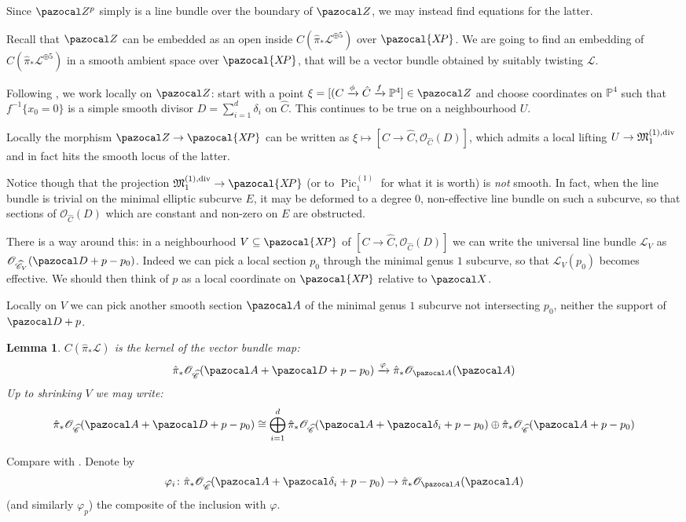 \documentclass[11pt]{amsart}
\newcommand{\PP}{\mathbb P}
\newcommand{\OO}{\mathcal O}
\renewcommand{\to}{\rightarrow}
\newcommand{\A}{\pazocal A}
\newcommand{\X}{\pazocal X}
\newcommand{\XP}{\pazocal{X\!P}}
\newcommand{\hC}{\widehat{\mathcal C}}
\newcommand{\Z}{\pazocal Z}
\newcommand{\MM}{\mathfrak M}
\newcommand{\Pic}{\operatorname{Pic}}
\theoremstyle{plain}
\newtheorem{lem}[thm]{Lemma}
\theoremstyle{definition}
\begin{document}
Since $\Z^p$ simply is a line bundle over the boundary of $\Z$, we may instead find equations for the latter.

Recall that $\Z$ can be embedded as an open inside $C(\hat{\pi}_*\mathcal L^{\oplus 5})$ over $\XP$. We are going to find an embedding of $C(\hat{\pi}_*\mathcal L^{\oplus 5})$ in a smooth ambient space over $\XP$, that will be a vector bundle obtained by suitably twisting $\mathcal L$.

Following \cite{HL}, we work locally on $\Z$: start with a point $\xi=[(C\xrightarrow{\phi}\hat C\xrightarrow{f}\PP^4]\in\Z$ and choose coordinates on $\PP^4$ such that $f^{-1}\{x_0=0\}$ is a simple smooth divisor $D=\sum_{i=1}^d\delta_i$ on $\hat C$. This continues to be true on a neighbourhood $U$.

 Locally the morphism $\Z\to\XP$ can be written as $\xi\mapsto[C\to\hat C,\OO_{\hat C}(D)]$, which admits a local lifting $U\to\MM_1^{(1),\rm{div}}$ and in fact hits the smooth locus of the latter.
 
  Notice though that the projection $\MM_1^{(1),\rm{div}}\to \XP$ (or to $\Pic_1^{(1)}$ for what it is worth) is \emph{not} smooth. In fact, when the line bundle is trivial on the minimal elliptic subcurve $E$, it may be deformed to a degree $0$, non-effective line bundle on such a subcurve, so that sections of $\OO_{\hat C}(D)$ which are constant and non-zero on $E$ are obstructed.

There is a way around this: in a neighbourhood $V\subseteq \XP$ of $[C\to\hat C,\OO_{\hat C}(D)]$ we can write the universal line bundle $\mathcal L_V$ as $\OO_{\hC_V}(\pazocal D + p-p_0)$. Indeed we can pick a local section $p_0$ through the minimal genus $1$ subcurve, so that $\mathcal L_V(p_0)$ becomes effective. We should then think of $p$ as a local coordinate on $\XP$ relative to $\X$.

Locally on $V$ we can pick another smooth section $\A$ of the minimal genus $1$ subcurve not intersecting $p_0$, neither the support of $\pazocal D+p$.

\begin{lem}
$C(\hat\pi_*\mathcal L)$ is the kernel of the vector bundle map:
\[ \hat\pi_*\OO_{\hC}(\A+\pazocal D+p-p_0)\xrightarrow{\varphi}\hat\pi_*\OO_{\A}(\A)\]
Up to shrinking $V$ we may write:
\[\hat\pi_*\OO_{\hC}(\A+\pazocal D+p-p_0)\cong\bigoplus_{i=1}^d\hat\pi_*\OO_{\hC}(\A+\pazocal \delta_i+p-p_0)\oplus\hat\pi_*\OO_{\hC}(\A+p-p_0)\]
\end{lem}
Compare with \cite[Lemma 4.10]{HL}. Denote by \[\varphi_i\colon\hat\pi_*\OO_{\hC}(\A+\pazocal \delta_i+p-p_0)\to\hat\pi_*\OO_{\A}(\A)\] (and similarly $\varphi_p$) the composite of the inclusion with $\varphi$.
\end{document}
